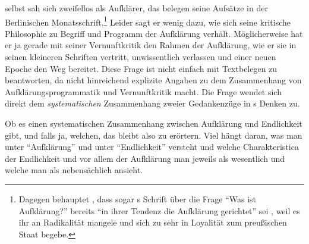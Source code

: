  selbst sah sich zweifellos als Aufklärer, das belegen
seine Aufsätze in der Berlinischen Monatsschrift.\footnote{Dagegen behauptet
,
dass sogar s Schrift über die Frage \enquote{Was ist
Aufklärung?} bereits \enquote{in ihrer Tendenz  die Aufklärung
gerichtet} sei
\parencite[][12]{Beyerhaus:KantsenquoteProgrammderAufklaerungausdemJahre17841921},
weil es ihr an Radikalität mangele und  sich zu sehr in
Loyalität zum preußischen Staat begebe.} Leider sagt er wenig dazu, wie
sich seine kritische Philosophie zu Begriff und Programm der Aufklärung verhält.
Möglicherweise hat er ja gerade mit seiner Vernunftkritik den Rahmen der
Aufklärung, wie er sie in seinen kleineren Schriften vertritt, unwissentlich
verlassen und einer neuen Epoche den Weg bereitet. Diese Frage ist nicht einfach
mit Textbelegen zu beantworten, da  nicht hinreichend explizite
Angaben zu dem Zusammenhang von Aufklärungsprogrammatik und Vernunftkritik
macht. Die Frage wendet sich direkt dem \emph{systematischen} Zusammenhang
zweier Gedankenzüge in s Denken zu.

Ob es einen systematischen Zusammenhang zwischen Aufklärung und Endlichkeit
gibt, und falls ja, welchen, das bleibt also zu erörtern. Viel hängt daran, was
man unter \enquote{Aufklärung} und unter \enquote{Endlichkeit} versteht und
welche Charakteristica der Endlichkeit und vor allem der Aufklärung man jeweils
als wesentlich und welche man als nebensächlich ansieht.

